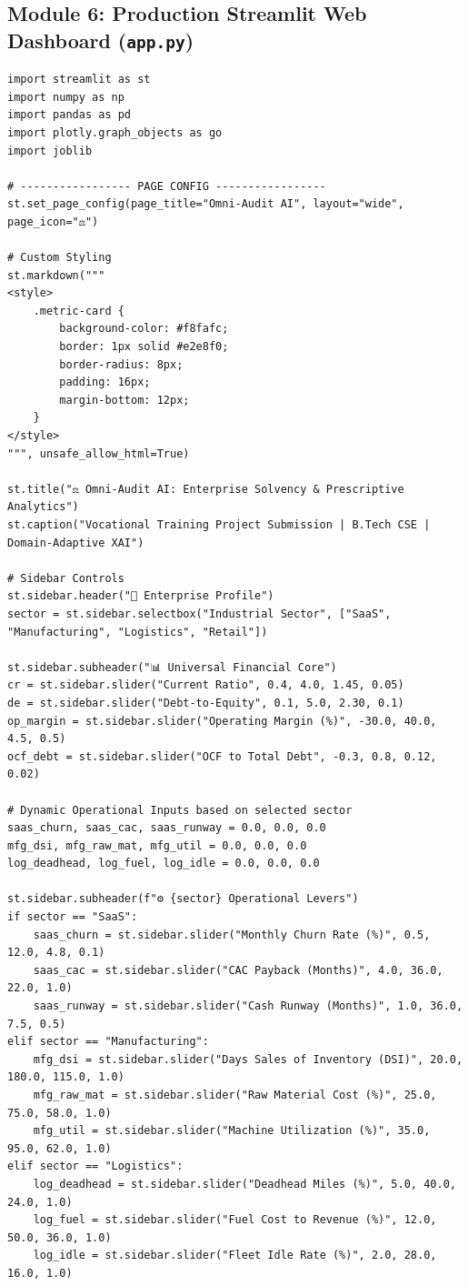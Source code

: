 \documentclass[11pt, a4paper]{article}
\begin{document}
\subsection{Module 6: Production Streamlit Web Dashboard (\texttt{app.py})}
\begin{verbatim}
import streamlit as st
import numpy as np
import pandas as pd
import plotly.graph_objects as go
import joblib

# ----------------- PAGE CONFIG -----------------
st.set_page_config(page_title="Omni-Audit AI", layout="wide", page_icon="⚖️")

# Custom Styling
st.markdown("""
<style>
    .metric-card {
        background-color: #f8fafc;
        border: 1px solid #e2e8f0;
        border-radius: 8px;
        padding: 16px;
        margin-bottom: 12px;
    }
</style>
""", unsafe_allow_html=True)

st.title("⚖️ Omni-Audit AI: Enterprise Solvency & Prescriptive Analytics")
st.caption("Vocational Training Project Submission | B.Tech CSE | Domain-Adaptive XAI")

# Sidebar Controls
st.sidebar.header("🏢 Enterprise Profile")
sector = st.sidebar.selectbox("Industrial Sector", ["SaaS", "Manufacturing", "Logistics", "Retail"])

st.sidebar.subheader("📊 Universal Financial Core")
cr = st.sidebar.slider("Current Ratio", 0.4, 4.0, 1.45, 0.05)
de = st.sidebar.slider("Debt-to-Equity", 0.1, 5.0, 2.30, 0.1)
op_margin = st.sidebar.slider("Operating Margin (%)", -30.0, 40.0, 4.5, 0.5)
ocf_debt = st.sidebar.slider("OCF to Total Debt", -0.3, 0.8, 0.12, 0.02)

# Dynamic Operational Inputs based on selected sector
saas_churn, saas_cac, saas_runway = 0.0, 0.0, 0.0
mfg_dsi, mfg_raw_mat, mfg_util = 0.0, 0.0, 0.0
log_deadhead, log_fuel, log_idle = 0.0, 0.0, 0.0

st.sidebar.subheader(f"⚙️ {sector} Operational Levers")
if sector == "SaaS":
    saas_churn = st.sidebar.slider("Monthly Churn Rate (%)", 0.5, 12.0, 4.8, 0.1)
    saas_cac = st.sidebar.slider("CAC Payback (Months)", 4.0, 36.0, 22.0, 1.0)
    saas_runway = st.sidebar.slider("Cash Runway (Months)", 1.0, 36.0, 7.5, 0.5)
elif sector == "Manufacturing":
    mfg_dsi = st.sidebar.slider("Days Sales of Inventory (DSI)", 20.0, 180.0, 115.0, 1.0)
    mfg_raw_mat = st.sidebar.slider("Raw Material Cost (%)", 25.0, 75.0, 58.0, 1.0)
    mfg_util = st.sidebar.slider("Machine Utilization (%)", 35.0, 95.0, 62.0, 1.0)
elif sector == "Logistics":
    log_deadhead = st.sidebar.slider("Deadhead Miles (%)", 5.0, 40.0, 24.0, 1.0)
    log_fuel = st.sidebar.slider("Fuel Cost to Revenue (%)", 12.0, 50.0, 36.0, 1.0)
    log_idle = st.sidebar.slider("Fleet Idle Rate (%)", 2.0, 28.0, 16.0, 1.0)


\end{verbatim}
\end{document}
